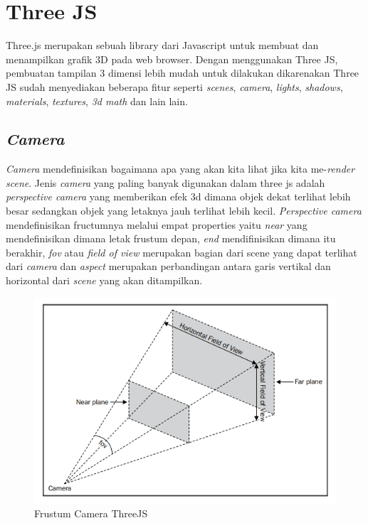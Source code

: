 \section{Three JS}
Three.js merupakan sebuah library dari Javascript untuk
membuat dan menampilkan grafik 3D pada web browser. Dengan menggunakan Three JS, pembuatan tampilan 3 dimensi lebih mudah untuk dilakukan dikarenakan Three JS sudah menyediakan beberapa fitur seperti \textit{scenes}, \textit{camera}, \textit{lights}, \textit{shadows}, \textit{materials}, \textit{textures}, \textit{3d math} dan lain lain.
\subsection{\emph{Camera}}
\textit{Camera} mendefinisikan bagaimana apa yang akan kita lihat jika kita me-\textit{render} \textit{scene}. Jenis \textit{camera} yang paling banyak digunakan dalam three js adalah \textit{perspective camera} yang memberikan efek 3d dimana objek dekat terlihat lebih besar sedangkan objek yang letaknya jauh terlihat lebih kecil.
\textit{Perspective camera} mendefinisikan fructumnya melalui empat properties yaitu \textit{near} yang mendefinisikan dimana letak frustum depan, \textit{end} mendifinisikan dimana itu berakhir, \textit{fov} atau \textit{field of view} merupakan bagian dari scene yang dapat terlihat dari \textit{camera} dan \textit{aspect} merupakan perbandingan antara garis vertikal dan horizontal dari \textit{scene} yang akan ditampilkan.

\begin{figure}[H]
	\centering
	\includegraphics[keepaspectratio, width=12cm]{gambar/fructum}
	\caption{Frustum Camera ThreeJS}
	\label{gambar:fructum.png}
\end{figure}


